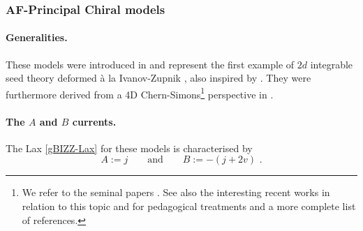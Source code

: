 \documentclass[12pt]{article}
\numberwithin{equation}{section}
\begin{document}
\subsubsection{AF-Principal Chiral models}\label{subsubsec:AFPCM}

\paragraph{Generalities.} These models were introduced in \cite{Ferko:2024ali} and represent the first example of $2d$ integrable seed theory deformed à la Ivanov-Zupnik \cite{Ivanov:2002ab,Ivanov:2003uj}, also inspired by \cite{Borsato:2022tmu,Ferko:2023wyi}. They were furthermore derived from a 4D Chern-Simons\footnote{We refer to the seminal papers \cite{Costello:2019tri,Vicedo:2019dej,Delduc:2019whp}. See also the interesting recent works \cite{Boujakhrout:2023qlz,Lacroix:2024wrd,Cole:2024sje,Lacroix:2025ias,Sakamoto:2025hwi,Fukushima:2025tlj,Cole:2025zmq,Bittleston:2026tdr,Stedman:2026awg,Ashwinkumar:2026dwd} in relation to this topic and \cite{Lacroix:2021iit,Cole:2024hyt,Liniado:2025sin} for pedagogical treatments and a more complete list of references.} perspective in \cite{Fukushima:2024nxm}.

\paragraph{The $A$ and $B$ currents.} The Lax \eqref{gBIZZ-Lax} for these models is characterised by 
\begin{equation}\label{A-B-currents-AF-PCM}
A:=j
\qquad \text{and} \qquad 
B:=-(j+2v) \,\, . 
\end{equation}
\end{document}
